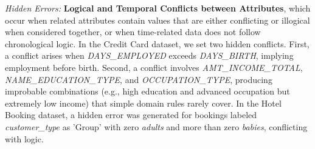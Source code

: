 

\textit{Hidden Errors:}
\textbf{Logical and Temporal Conflicts between Attributes}, which occur when related attributes contain values that are either conflicting or illogical when considered together, or when time-related data does not follow chronological logic. 
In the Credit Card dataset, we set two hidden conflicts. 
First, a conflict arises when \textit{DAYS\_EMPLOYED} exceeds \textit{DAYS\_BIRTH}, implying employment before birth. 
Second, a conflict involves \textit{AMT\_INCOME\_TOTAL},
\textit{NAME\_EDUCATION\_TYPE}, and \textit{OCCUPATION\_TYPE}, producing improbable combinations (e.g., high education and advanced occupation but extremely low income) that simple domain rules rarely cover.
In the Hotel Booking dataset, a hidden error was generated for bookings labeled \textit{customer\_type} as 'Group' with zero \textit{adults} and more than zero \textit{babies}, conflicting with logic.

